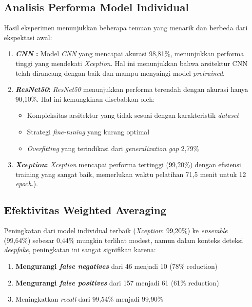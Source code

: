\subsection{Analisis Performa Model Individual}

Hasil eksperimen menunjukkan beberapa temuan yang menarik dan berbeda dari ekspektasi awal:

\begin{enumerate}
    \item \textbf{\textit{CNN} :} Model \textit{CNN} yang  mencapai akurasi 98,81\%, menunjukkan performa tinggi yang mendekati \textit{Xception}. Hal ini menunjukkan bahwa arsitektur CNN telah dirancang dengan baik dan mampu menyaingi model \textit{pretrained}.
    
    \item \textbf{\textit{ResNet50}:} \textit{ResNet50} menunjukkan performa terendah dengan akurasi hanya 90,10\%. Hal ini kemungkinan disebabkan oleh:
    \begin{itemize}
        \item Kompleksitas arsitektur yang tidak sesuai dengan karakteristik \textit{dataset}
        \item Strategi \textit{fine-tuning} yang kurang optimal
        \item \textit{Overfitting} yang terindikasi dari \textit{generalization gap} 2,79\%
    \end{itemize}
    
    \item \textbf{\textit{Xception}:} \textit{Xception} mencapai performa tertinggi (99,20\%) dengan efisiensi training yang sangat baik, memerlukan waktu pelatihan 71,5 menit untuk 12 \textit{epoch}.).
\end{enumerate}

\subsection{Efektivitas Weighted Averaging}

Peningkatan dari model individual terbaik (\textit{Xception}: 99,20\%) ke \textit{ensemble} (99,64\%) sebesar 0,44\% mungkin terlihat modest, namun dalam konteks deteksi \textit{deepfake}, peningkatan ini sangat signifikan karena:

\begin{enumerate}
    \item \textbf{Mengurangi \textit{false negatives}} dari 46 menjadi 10 (78\% reduction)
    \item \textbf{Mengurangi \textit{false positives}} dari 157 menjadi 61 (61\% reduction)
    \item Meningkatkan \textit{recall} dari 99,54\% menjadi 99,90\%
\end{enumerate}

